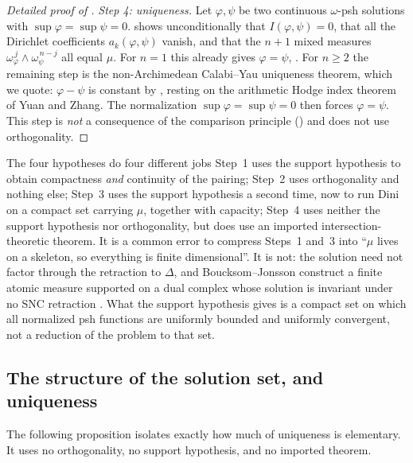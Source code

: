 \begin{proof}[Detailed proof of ]
\emph{Step 4: uniqueness.}  Let $\varphi,\psi$ be two continuous
$\omega$-psh solutions with $\sup\varphi=\sup\psi=0$.
 shows unconditionally that
$I(\varphi,\psi)=0$, that all the Dirichlet coefficients
$a_k(\varphi,\psi)$ vanish, and that the $n+1$ mixed measures
$\omega_\varphi^{\,j}\wedge\omega_\psi^{\,n-j}$ all equal $\mu$.  For
$n=1$ this already gives $\varphi=\psi$,
.  For $n\geq2$ the remaining step is the
non-Archimedean Calabi--Yau uniqueness theorem, which we quote:
$\varphi-\psi$ is constant by \cite[Proposition~8.2]{BFJ15}, resting on
the arithmetic Hodge index theorem of Yuan and Zhang.  The normalization
$\sup\varphi=\sup\psi=0$ then forces $\varphi=\psi$.  This step is
\emph{not} a consequence of the comparison principle
() and does not use orthogonality.
\end{proof}

\begin{warning}{The four hypotheses do four different jobs}
Step~1 uses the support hypothesis to obtain compactness \emph{and}
continuity of the pairing; Step~2 uses orthogonality and nothing else;
Step~3 uses the support hypothesis a second time, now to run Dini on a
compact set carrying $\mu$, together with capacity; Step~4 uses neither
the support hypothesis nor orthogonality, but does use an imported
intersection-theoretic theorem.  It is a common error to compress Steps~1
and~3 into ``$\mu$ lives on a skeleton, so everything is finite
dimensional''.  It is not: the solution need not factor through the
retraction to $\Delta$, and Boucksom--Jonsson construct a finite atomic
measure supported on a dual complex whose solution is invariant under no
SNC retraction \cite[Theorem~B]{BJGreen24}.  What the support hypothesis
gives is a compact set on which all normalized psh functions are uniformly
bounded and uniformly convergent, not a reduction of the problem to that
set.
\end{warning}

\subsection{The structure of the solution set, and uniqueness}
\label{sec:ch28-uniqueness}

The following proposition isolates exactly how much of uniqueness is
elementary.  It uses no orthogonality, no support hypothesis, and no
imported theorem.

